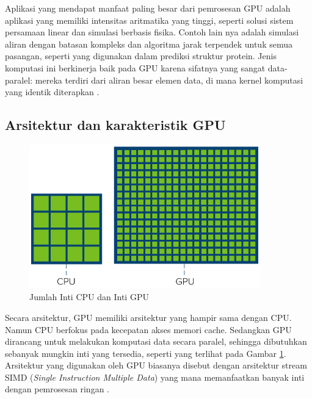 Aplikasi yang mendapat manfaat paling besar dari pemrosesan GPU adalah aplikasi
yang memiliki intensitas aritmatika yang tinggi, seperti solusi sistem persamaan
linear dan simulasi berbasis fisika. Contoh lain nya adalah simulasi aliran
dengan batasan kompleks dan algoritma jarak terpendek untuk semua pasangan, seperti
yang digunakan dalam prediksi struktur protein. Jenis komputasi ini berkinerja
baik pada GPU karena sifatnya yang sangat data-paralel: mereka terdiri dari aliran
besar elemen data, di mana kernel komputasi yang identik diterapkan \citep{pharrGPUGemsProgramming2005}.

\subsection{Arsitektur dan karakteristik GPU}


\begin{figure}[H]
  \centering
  \includegraphics[width=10cm]{images/cpu-vs-gpu-cores.png}
  \caption{Jumlah Inti CPU dan Inti GPU}
  \label{gambar gpu-cpu cores}
\end{figure}

Secara arsitektur, GPU memiliki arsitektur yang hampir sama dengan CPU. Namun
CPU berfokus pada kecepatan akses memori cache. Sedangkan GPU dirancang untuk melakukan
komputasi data secara paralel, sehingga dibutuhkan sebanyak mungkin inti yang
tersedia, seperti yang terlihat pada Gambar \ref{gambar gpu-cpu cores}.
Arsitektur yang digunakan oleh GPU biasanya disebut dengan arsitektur stream
SIMD (\emph{Single Instruction Multiple Data}) yang mana memanfaatkan banyak inti
dengan pemrosesan ringan \citep{helenGPUArchitectureStructure2020}.




